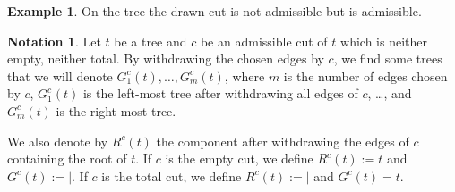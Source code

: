 \documentclass[pdftex]{sigma}
\numberwithin{equation}{section}
\theoremstyle{definition}
\newtheorem{Eg}[defi]{Example}
\newtheorem{Not}[defi]{Notation}
\theoremstyle{plain}
\begin{document}
\begin{Eg}
On the tree  the drawn cut is not admissible but  is admissible.
\end{Eg}
\begin{Not}
	Let $t$ be a tree and $c$ be an admissible cut of $t$ which is neither empty, neither total. By withdrawing the chosen edges by $c$, we find some trees that we will denote $G^c_1(t),\dots,G^c_m(t)$, where $m$ is the number of edges chosen by $c$, $G^c_1(t)$ is the left-most tree after withdrawing all edges of $c$, \dots, and $G^c_m(t)$ is the right-most tree.
	
	We also denote by $R^c(t)$ the component after withdrawing the edges of $c$ containing the root of $t$.
	If $c$ is the empty cut, we define $R^c(t):=t$ and $G^c(t):=|.$ If $c$ is the total cut, we define $R^c(t):=|$ and $G^c(t)=t.$
\end{Not}
\end{document}
